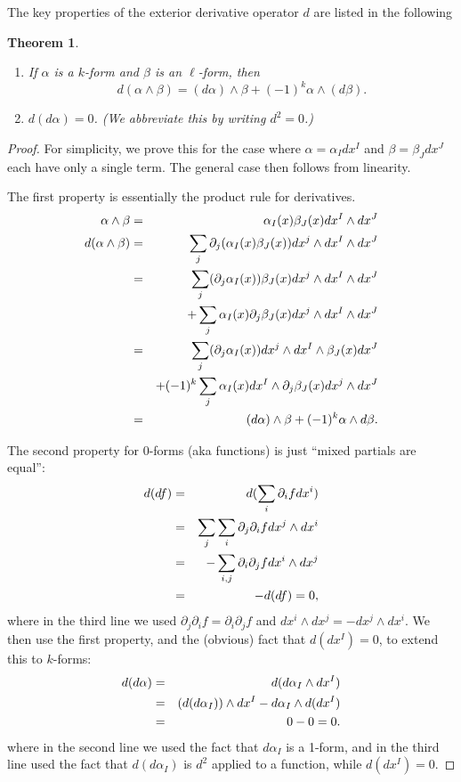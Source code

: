 \documentclass[12pt]{amsbook}
\newtheorem{thm}{Theorem}[section]
\theoremstyle{definition}
\begin{document}
The key properties of the exterior derivative operator $d$ are listed in
the following
\begin{thm}
\begin{enumerate}
\item
If $\alpha$ is a $k$-form and $\beta$ is an $\ell$-form, then 
$$ d(\alpha \wedge \beta) = (d \alpha) \wedge \beta + (-1)^k \alpha \wedge
(d \beta).$$
\item $d(d\alpha)=0$. (We abbreviate this by writing $d^2=0$.) 
\end{enumerate}
\end{thm}

\begin{proof} For simplicity, we prove this for the case where
 $\alpha = \alpha_I dx^I$ and $\beta = \beta_J dx^J$ each have only a single
term. The general case then follows from linearity. 

The first property is essentially the product rule for 
derivatives. 
\begin{eqnarray} 
\alpha \wedge \beta & = & \alpha_I(x) \beta_J(x) dx^I \wedge dx^J \cr 
d(\alpha \wedge \beta) & = & \sum_j \partial_j(\alpha_I(x) \beta_J(x))
dx^j \wedge dx^I \wedge dx^J \cr 
& = & \sum_j (\partial_j \alpha_I(x)) \beta_J(x) dx^j \wedge dx^I \wedge dx^J
\cr && + \sum_j \alpha_I(x) \partial_j \beta_J(x) dx^j \wedge dx^I \wedge dx^J
\cr & = & \sum_j (\partial_j \alpha_I(x)) dx^j \wedge dx^I \wedge 
\beta_J(x) dx^J
\cr && + (-1)^k \sum_j \alpha_I(x) dx^I \wedge \partial_j \beta_J(x) dx^j \wedge
dx^J
\cr &=& (d\alpha) \wedge \beta + (-1)^k \alpha \wedge d\beta.
\end{eqnarray}

The second property for 0-forms (aka functions) is just ``mixed partials are
equal'': 
\begin{eqnarray} d(df) & = &  d (\sum_i \partial_if dx^i) \cr 
& = & \sum_j\sum_i \partial_j\partial_i f dx^j \wedge dx^i\cr 
& = & - \sum_{i,j} \partial_i\partial_j f dx^i \wedge dx^j \cr  
& = & - d(df) = 0,
\end{eqnarray}
where in the third line we used 
$\partial_j\partial_i f = \partial_i \partial_j f$ and 
$dx^i \wedge dx^j = - dx^j \wedge dx^i$. We then use the first property, and
the (obvious) fact that $d(dx^I)=0$, to extend this to $k$-forms:
\begin{eqnarray}
d(d\alpha) & = & d (d\alpha_I \wedge dx^I) \cr 
& = & (d (d \alpha_I))\wedge dx^I - d\alpha_I \wedge d(dx^I) \cr 
& = & 0 - 0 = 0.
\end{eqnarray}
where in the second line we used the fact that $d\alpha_I$ is a 1-form,
and in the third line used the fact that $d(d\alpha_I)$ is $d^2$ applied to
a function, while $d(dx^I)=0$.
\end{proof}
\end{document}

